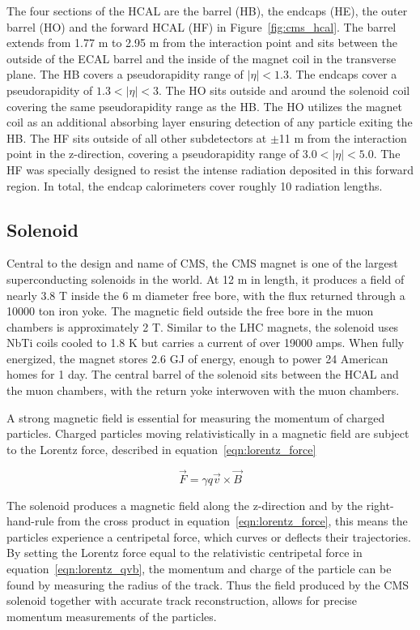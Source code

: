 The four sections of the HCAL are the barrel (HB), the endcaps (HE), the outer barrel (HO) and the forward HCAL (HF) in Figure~\ref{fig:cms_hcal}. The barrel extends from 1.77 m to 2.95 m from the interaction point and
sits between the outside of the ECAL barrel and the inside of the magnet coil in the transverse plane. The HB covers a pseudorapidity range of $|\eta| < 1.3$.
The endcaps cover a pseudorapidity of $1.3 < |\eta| < 3$. The HO sits outside and around the solenoid coil covering the same pseudorapidity range
as the HB. The HO utilizes the magnet coil as an additional absorbing layer ensuring detection of any particle exiting the HB. The HF sits outside of all other subdetectors at $\pm$11 m from the interaction point in the z-direction,
covering a pseudorapidity range of $3.0 < |\eta| < 5.0$. The HF was specially designed to resist the intense radiation deposited in this forward region. In total, the endcap calorimeters cover roughly 10 radiation lengths.

\subsection{Solenoid}
Central to the design and name of CMS, the CMS magnet is one of the largest superconducting solenoids in the world.
At 12 m in length, it produces a field of nearly 3.8 T inside the 6 m diameter free bore, with the flux returned through a 10000 ton iron yoke.
The magnetic field outside the free bore in the muon chambers is approximately 2 T.  
Similar to the LHC magnets, the solenoid uses NbTi coils cooled to 1.8 K but carries a current of over 19000 amps. When fully energized, the magnet
stores 2.6 GJ of energy, enough to power 24 American homes for 1 day\cite{magnet_energy}. The central barrel of the solenoid sits between the HCAL and the muon chambers, with the return yoke interwoven with the muon chambers.

A strong magnetic field is essential for measuring the momentum of charged particles. Charged particles moving relativistically in a magnetic field are subject to the Lorentz force, described in
equation~\ref{eqn:lorentz_force} 

\begin{equation}
\label{eqn:lorentz_force}
 \vec{F} = \gamma q\vec{v} \times \vec{B}
\end{equation}

The solenoid produces a magnetic field along the z-direction and by the right-hand-rule from the cross product in equation~\ref{eqn:lorentz_force}, this means the particles experience a centripetal force, which
curves or deflects their trajectories. By setting the Lorentz force equal to the relativistic centripetal force in equation~\ref{eqn:lorentz_qvb}, the momentum and charge of the particle can be found by measuring the radius of the track. 
Thus the field produced by the CMS solenoid together with accurate track reconstruction, allows for precise momentum measurements of the particles.

